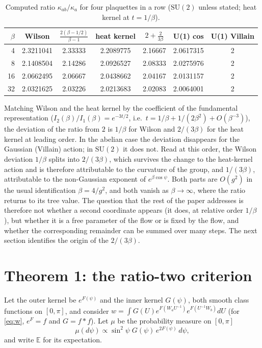 \documentclass[11pt,a4paper]{article}
\theoremstyle{definition}
\theoremstyle{remark}
\newcommand{\E}{\mathbb{E}}
\newcommand{\SU}{\mathrm{SU}(2)}
\begin{document}
\begin{table}[h]
\centering\small
\caption{Computed ratio $\kappa_{ab}/\kappa_a$ for four plaquettes in a row ($\SU$ unless stated; heat kernel at $t=1/\beta$).}\label{tab:ratio}
\begin{tabular}{@{}rcccccc@{}}
\toprule
$\beta$ & Wilson & $\frac{2(\beta-1/2)}{\beta-1}$ & heat kernel & $2+\frac{2}{3\beta}$ & U(1) cos & U(1) Villain\\ \midrule
4 & 2.3211041 & 2.33333 & 2.2089775 & 2.16667 & 2.0617315 & 2\\
8 & 2.1408504 & 2.14286 & 2.0926527 & 2.08333 & 2.0275976 & 2\\
16 & 2.0662495 & 2.06667 & 2.0438662 & 2.04167 & 2.0131157 & 2\\
32 & 2.0321625 & 2.03226 & 2.0213683 & 2.02083 & 2.0064001 & 2\\
\bottomrule
\end{tabular}
\end{table}

Matching Wilson and the heat kernel by the coefficient of the fundamental representation ($I_2(\beta)/I_1(\beta)=e^{-3t/2}$, i.e.\ $t=1/\beta+1/(2\beta^2)+O(\beta^{-3})$), the deviation of the ratio from $2$ is $1/\beta$ for Wilson and $2/(3\beta)$ for the heat kernel at leading order.
In the abelian case the deviation disappears for the Gaussian (Villain) action; in $\SU$ it does not.
Read at this order, the Wilson deviation $1/\beta$ splits into $2/(3\beta)$, which survives the change to the heat-kernel action and is therefore attributable to the curvature of the group, and $1/(3\beta)$, attributable to the non-Gaussian exponent of $e^{\beta\cos\psi}$.
Both parts are $O(g^2)$ in the usual identification $\beta=4/g^2$, and both vanish as $\beta\to\infty$, where the ratio returns to its tree value.
The question that the rest of the paper addresses is therefore not whether a second coordinate appears (it does, at relative order $1/\beta$), but whether it is a free parameter of the flow or is fixed by the flow, and whether the corresponding remainder can be summed over many steps.
The next section identifies the origin of the $2/(3\beta)$.

\section{Theorem 1: the ratio-two criterion}\label{sec:thm1}

Let the outer kernel be $e^{F(\psi)}$ and the inner kernel $G(\psi)$, both smooth class functions on $[0,\pi]$, and consider $w=\int G(U)e^{F(W_aU^{-1})}e^{F(U^{-1}W_b)}dU$ (for \eqref{eq:w}, $e^F=f$ and $G=f*f$).
Let $\mu$ be the probability measure on $[0,\pi]$
\[
\mu(d\psi)\propto\sin^2\psi\;G(\psi)\,e^{2F(\psi)}\,d\psi,
\]
and write $\E$ for its expectation.
\end{document}
